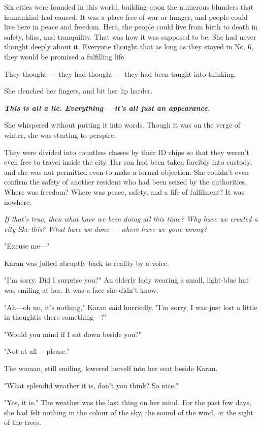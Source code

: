 Six cities were founded in this world, building upon the numerous
blunders that humankind had caused. It was a place free of war or
hunger, and people could live here in peace and freedom. Here, the
people could live from birth to death in safety, bliss, and tranquility.
That was how it was supposed to be. She had never thought deeply about
it. Everyone thought that as long as they stayed in No. 6, they would be
promised a fulfilling life.

They thought --- they had thought --- they had been taught into thinking.

She clenched her fingers, and bit her lip harder.

\textbf{\emph{This is all a lie. Everything--- it's all just an appearance.}}

She whispered without putting it into words. Though it was on the verge
of winter, she was starting to perspire.

They were divided into countless classes by their ID chips so that they
weren't even free to travel inside the city. Her son had been taken
forcibly into custody, and she was not permitted even to make a formal
objection. She couldn't even confirm the safety of another resident who
had been seized by the authorities. Where was freedom? Where was peace,
safety, and a life of fulfilment? It was nowhere.

\emph{If that's true, then what have we been doing all this time? Why have we
created a city like this? What have we done --- where have we gone wrong?}

"Excuse me---"

Karan was jolted abruptly back to reality by a voice.

"I'm sorry. Did I surprise you?" An elderly lady wearing a small,
light-blue hat was smiling at her. It was a face she didn't know.

"Ah---oh no, it's nothing," Karan said hurriedly. "I'm sorry, I was just
lost a little in thought\el is there something---?"

"Would you mind if I sat down beside you?"

"Not at all--- please."

The woman, still smiling, lowered herself into her seat beside Karan.

"What splendid weather it is, don't you think? So nice."

"Yes, it is." The weather was the last thing on her mind. For the past
few days, she had felt nothing in the colour of the sky, the sound of
the wind, or the sight of the trees.

